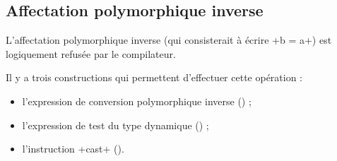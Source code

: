 \subsection{Affectation polymorphique inverse}

L'affectation polymorphique inverse (qui consisterait à écrire \ggst+b = a+) est logiquement refusée par le compilateur.

Il y a trois constructions qui permettent d'effectuer cette opération :
\begin{itemize}
  \item l'expression de conversion polymorphique inverse () ;
  \item l'expression de test du type dynamique () ;
  \item l'instruction \ggst+cast+ ().
\end{itemize}

%
%
%
%
%
%
%
%


